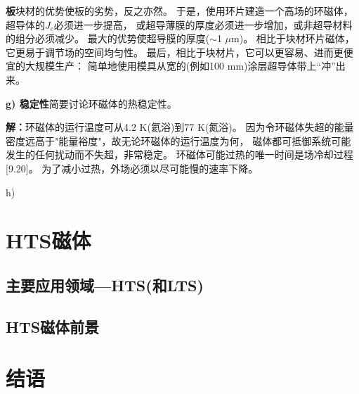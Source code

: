 \textbf{板}\qquad 块材的优势使板的劣势，反之亦然。
于是，使用环片建造一个高场的环磁体，超导体的$J_c$必须进一步提高，
或超导薄膜的厚度必须进一步增加，或非超导材料的组分必须减少。
最大的优势使超导膜的厚度($\sim$1 $\mu$m)。
相比于块材环片磁体，它更易于调节场的空间均匀性。
最后，相比于块材片，它可以更容易、进而更便宜的大规模生产：
简单地使用模具从宽的(例如100 mm)涂层超导体带上“冲”出来。


\textbf{g) 稳定性}\qquad 简要讨论环磁体的热稳定性。

\textbf{解：}环磁体的运行温度可从4.2 K(氦浴)到77 K(氮浴)。
因为令环磁体失超的能量密度远高于"能量裕度"，故无论环磁体的运行温度为何，
磁体都可抵御系统可能发生的任何扰动而不失超，非常稳定。
环磁体可能过热的唯一时间是场冷却过程[9.20]。
为了减小过热，外场必须以尽可能慢的速率下降。

h) 

\section{HTS磁体}
\subsection{主要应用领域---HTS(和LTS)}



\subsection{HTS磁体前景}



\section{结语}
